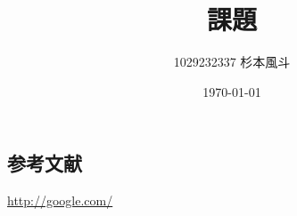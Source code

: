 \documentclass[12pt]{article}
\title{課題}
\author{1029232337 杉本風斗}
\date{\today}
\begin{document}
\lstset{numbers=left,basicstyle=\small\ttfamily}
\maketitle
\section{}


\subsection{参考文献}
\url{http://google.com/}
\end{document}
